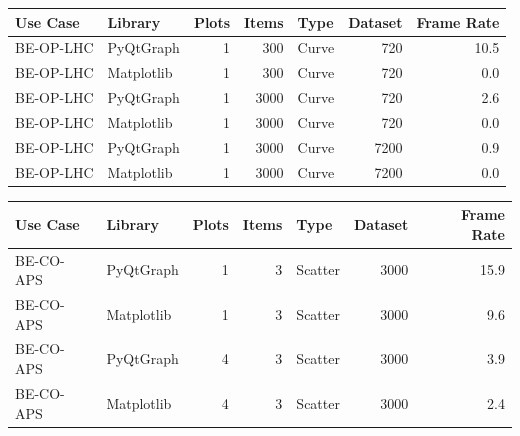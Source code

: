 \begin{table}[h]
\begin{center}
\begin{tabular}{llrrlrr}
\end{tabular}
\end{center}
\end{table}


\begin{table}[h]
\begin{center}

\label{tab:application:usecases:results:lhc}

\begin{tabular}{llrrlrr}

\hline
Use Case  & Library    & Plots & Items & Type    & Dataset & Frame Rate  \\
\hline
BE-OP-LHC & PyQtGraph  & 1     & 300   & Curve   & 720     & 10.5        \\
BE-OP-LHC & Matplotlib & 1     & 300   & Curve   & 720     & 0.0         \\
BE-OP-LHC & PyQtGraph  & 1     & 3000  & Curve   & 720     & 2.6         \\
BE-OP-LHC & Matplotlib & 1     & 3000  & Curve   & 720     & 0.0         \\
BE-OP-LHC & PyQtGraph  & 1     & 3000  & Curve   & 7200    & 0.9         \\
BE-OP-LHC & Matplotlib & 1     & 3000  & Curve   & 7200    & 0.0         \\
\hline

\end{tabular}
\end{center}
\end{table}


\begin{table}[h]
\begin{center}

\label{tab:application:usecases:results:aps}

\begin{tabular}{llrrlrr}

\hline
Use Case  & Library    & Plots & Items & Type    & Dataset & Frame Rate  \\
\hline
BE-CO-APS & PyQtGraph  & 1     & 3     & Scatter & 3000    & 15.9        \\
BE-CO-APS & Matplotlib & 1     & 3     & Scatter & 3000    & 9.6         \\
BE-CO-APS & PyQtGraph  & 4     & 3     & Scatter & 3000    & 3.9         \\
BE-CO-APS & Matplotlib & 4     & 3     & Scatter & 3000    & 2.4         \\
\hline

\end{tabular}
\end{center}
\end{table}


